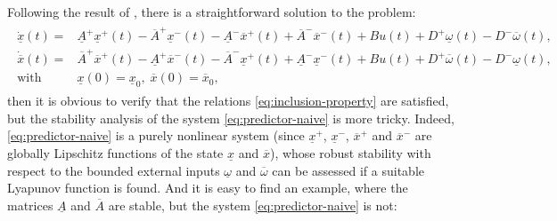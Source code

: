 Following the result of , there is a straightforward solution to the problem:
\begin{align}
\begin{split}
\dot{\underline{x}}(t) = {} & \underline{A}^{+}\underline{x}^{+}(t)-\overline{A}^{+}\underline{x}^{-}(t)-\underline{A}^{-}\overline{x}^{+}(t) +\overline{A}^{-}\overline{x}^{-}(t) + Bu(t)+D^{+}\underline{\omega}(t)-D^{-}\overline{\omega}(t),\label{eq:predictor-naive}\\
\dot{\overline{x}}(t) =  {} & \overline{A}^{+}\overline{x}^{+}(t)-\underline{A}^{+}\overline{x}^{-}(t)-\overline{A}^{-}\underline{x}^{+}(t) +\underline{A}^{-}\underline{x}^{-}(t) + Bu(t) +D^{+}\overline{\omega}(t)-D^{-}\underline{\omega}(t), \\
\text{with }\, & \underline{x}(0)=  \underline{x}_{0},\;\overline{x}(0)=\overline{x}_{0}, 
\end{split}
\end{align}
then it is obvious to verify that the relations \eqref{eq:inclusion-property} are satisfied, but the stability analysis of the system \eqref{eq:predictor-naive} is more tricky. Indeed, \eqref{eq:predictor-naive} is a purely nonlinear system (since $\underline{x}^{+}$, $\underline{x}^{-}$, $\overline{x}^{+}$ and $\overline{x}^{-}$ are globally Lipschitz functions of the state $\underline{x}$ and $\overline{x}$), whose robust stability with respect to the bounded external inputs $\underline{\omega}$ and $\overline{\omega}$ can be assessed if a suitable Lyapunov function is found. And it is easy to find an example, where the matrices $\underline{A}$ and $\overline{A}$ are stable, but the system \eqref{eq:predictor-naive} is not:
